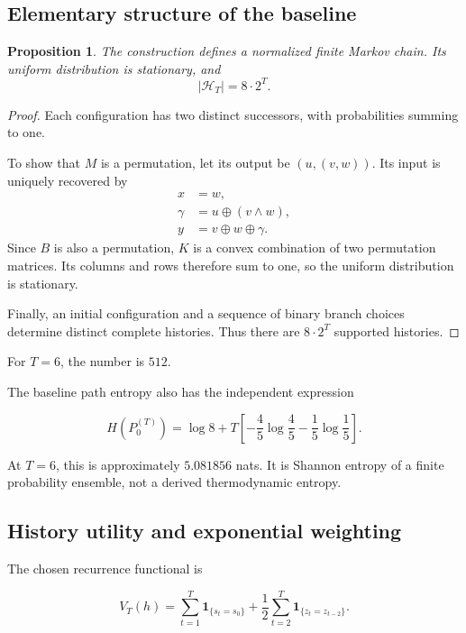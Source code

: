 \documentclass[11pt]{article}
\newtheorem{proposition}{Proposition}
\theoremstyle{remark}
\newcommand{\ind}{\mathbf{1}}
\newcommand{\Hcal}{\mathcal{H}}
\begin{document}
\subsection{Elementary structure of the baseline}

\begin{proposition}
The construction defines a normalized finite Markov chain. Its uniform distribution is stationary, and
\begin{equation}
|\Hcal_T|=8\cdot2^T.
\end{equation}
\end{proposition}

\begin{proof}
Each configuration has two distinct successors, with probabilities summing to one.

To show that \(M\) is a permutation, let its output be \((u,(v,w))\). Its input is uniquely recovered by
\begin{align}
x&=w,\\
\gamma&=u\oplus(v\land w),\\
y&=v\oplus w\oplus\gamma.
\end{align}
Since \(B\) is also a permutation, \(K\) is a convex combination of two permutation matrices. Its columns and rows therefore sum to one, so the uniform distribution is stationary.

Finally, an initial configuration and a sequence of binary branch choices determine distinct complete histories. Thus there are \(8\cdot2^T\) supported histories.
\end{proof}

For \(T=6\), the number is \(512\).

The baseline path entropy also has the independent expression

\begin{equation}
H(P_0^{(T)})
=
\log8
+
T\left[
-\frac45\log\frac45
-\frac15\log\frac15
\right].
\end{equation}

At \(T=6\), this is approximately \(5.081856\) nats. It is Shannon entropy of a finite probability ensemble, not a derived thermodynamic entropy.

\subsection{History utility and exponential weighting}

The chosen recurrence functional is

\begin{equation}
V_T(h)
=
\sum_{t=1}^{T}\ind_{\{s_t=s_0\}}
+
\frac12
\sum_{t=2}^{T}\ind_{\{z_t=z_{t-2}\}}.
\end{equation}
\end{document}
